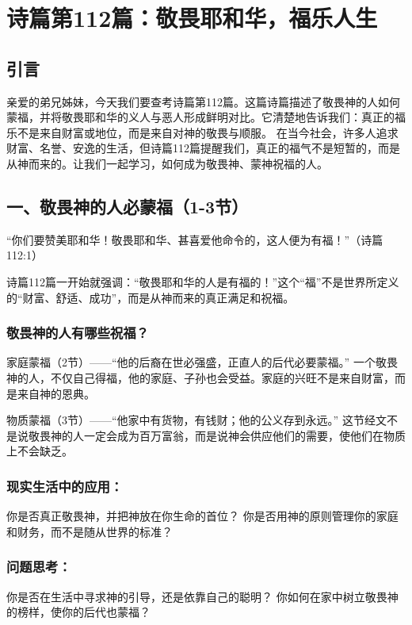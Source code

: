 \documentclass[a4paper, 12pt]{article}
\begin{document}
\section{诗篇第112篇：敬畏耶和华，福乐人生}
\subsection*{引言}
亲爱的弟兄姊妹，今天我们要查考诗篇第112篇。这篇诗篇描述了敬畏神的人如何蒙福，并将敬畏耶和华的义人与恶人形成鲜明对比。它清楚地告诉我们：真正的福乐不是来自财富或地位，而是来自对神的敬畏与顺服。
在当今社会，许多人追求财富、名誉、安逸的生活，但诗篇112篇提醒我们，真正的福气不是短暂的，而是从神而来的。让我们一起学习，如何成为敬畏神、蒙神祝福的人。

\subsection*{一、敬畏神的人必蒙福（1-3节）}
“你们要赞美耶和华！敬畏耶和华、甚喜爱他命令的，这人便为有福！”（诗篇112:1）

诗篇112篇一开始就强调：“敬畏耶和华的人是有福的！”这个“福”不是世界所定义的“财富、舒适、成功”，而是从神而来的真正满足和祝福。

\subsubsection*{敬畏神的人有哪些祝福？}

\hspace{0.6cm}家庭蒙福（2节）——“他的后裔在世必强盛，正直人的后代必要蒙福。”
一个敬畏神的人，不仅自己得福，他的家庭、子孙也会受益。家庭的兴旺不是来自财富，而是来自神的恩典。

物质蒙福（3节）——“他家中有货物，有钱财；他的公义存到永远。”
这节经文不是说敬畏神的人一定会成为百万富翁，而是说神会供应他们的需要，使他们在物质上不会缺乏。

\subsubsection*{现实生活中的应用：}

你是否真正敬畏神，并把神放在你生命的首位？
你是否用神的原则管理你的家庭和财务，而不是随从世界的标准？
\subsubsection*{问题思考：}

你是否在生活中寻求神的引导，还是依靠自己的聪明？
你如何在家中树立敬畏神的榜样，使你的后代也蒙福？
\end{document}
